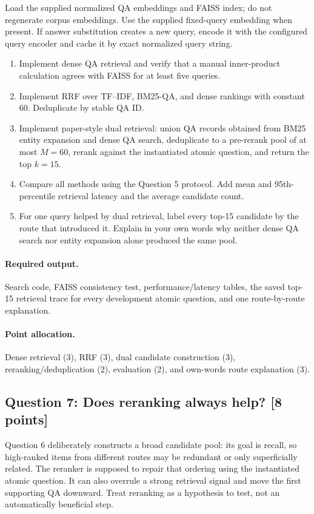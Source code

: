 \documentclass[11pt]{article}
\newcommand{\question}[3]{%
  \subsection[Question #1: #2 (#3 points)]{Question #1: #2 \hfill [#3 points]}%
}
\newcommand{\deliverables}{\paragraph{Required output.}}
\newcommand{\grading}{\paragraph{Point allocation.}}
\begin{document}
Load the supplied normalized QA embeddings and FAISS index; do not regenerate
corpus embeddings. Use the supplied fixed-query embedding when present. If
answer substitution creates a new query, encode it with the configured query
encoder and cache it by exact normalized query string.

\begin{enumerate}[label=(\alph*)]
  \item Implement dense QA retrieval and verify that a manual inner-product
        calculation agrees with FAISS for at least five queries.
  \item Implement RRF over TF--IDF, BM25-QA, and dense rankings with constant
        60. Deduplicate by stable QA ID.
  \item Implement paper-style dual retrieval: union QA records obtained from
        BM25 entity expansion and dense QA search, deduplicate to a pre-rerank
        pool of at most $M=60$, rerank against the instantiated atomic question,
        and return the top $k=15$.
  \item Compare all methods using the Question 5 protocol. Add mean and
        95th-percentile retrieval latency and the average candidate count.
  \item For one query helped by dual retrieval, label every top-15 candidate
        by the route that introduced it. Explain in your own words why neither
        dense QA search nor entity expansion alone produced the same pool.
\end{enumerate}

\deliverables Search code, FAISS consistency test, performance/latency tables,
the saved top-15 retrieval trace for every development atomic question, and
one route-by-route explanation.

\grading Dense retrieval (3), RRF (3), dual candidate construction (3),
reranking/deduplication (2), evaluation (2), and own-words route explanation
(3).

\question{7}{Does reranking always help?}{8}

Question 6 deliberately constructs a broad candidate pool: its goal is recall,
so high-ranked items from different routes may be redundant or only
superficially related. The reranker is supposed to repair that ordering using
the instantiated atomic question. It can also overrule a strong retrieval
signal and move the first supporting QA downward. Treat reranking as a
hypothesis to test, not an automatically beneficial step.
\end{document}
